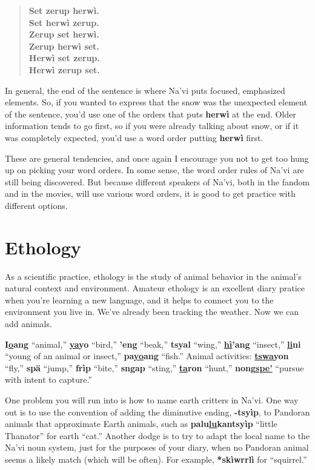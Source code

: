 \documentclass[nofonts]{tufte-handout}
\newcommand{\N}[1]{\textbf{\textcolor{navi}{#1}}}
\begin{document}
\begin{quotation}
  \noindent\N{Set zerup herwì.} \\
  \noindent\N{Set herwì zerup.} \\
  \noindent\N{Zerup set herwì.} \\
  \noindent\N{Zerup herwì set.} \\
  \noindent\N{Herwì set zerup.} \\
  \noindent\N{Herwì zerup set.}
\end{quotation}

\noindent In general, the end of the sentence is where Na'vi puts
focused, emphasized elements.  So, if you wanted to express that the
snow was the unexpected element of the sentence, you'd use one of the
orders that puts \N{herwì} at the end.  Older information
tends to go first, so if you were already talking about snow, or if it
was completely expected, you'd use a word order putting \N{herwì}
first.

These are general tendencies, and once again I encourage you not to
get too hung up on picking your word orders.  In some sense, the word
order rules of Na'vi are still being discovered.  But because
different speakers of Na'vi, both in the fandom and in the movies,
will use various word orders, it is good to get practice with
different options.


\section*{Ethology}
As a scientific practice, ethology is the study of animal behavior in
the animal's natural context and environment.  Amateur ethology is an
excellent diary pratice when you're learning a new language, and it
helps to connect you to the environment you live in.  We've already
been tracking the weather.  Now we can add animals.

\N{I\uline{o}ang} ``animal,'' \N{\uline{ya}yo} ``bird,'' \N{'eng}
``beak,'' \N{tsyal} ``wing,'' \N{\uline{hì}'ang} ``insect,''
\N{\uline{li}ni} ``young of an animal or insect,'' \N{pa\uline{yo}ang}
``fish.''  Animal activities: \N{\uline{tswa}yon} ``fly,'' \N{spä}
``jump,'' \N{frìp} ``bite,'' \N{sngap} ``sting,'' \N{\uline{ta}ron}
``hunt,'' \N{nong\uline{spe'}} ``pursue with intent to capture.''

One problem you will run into is how to name earth critters in Na'vi.
One way out is to use the convention of adding the diminutive ending,
\N{-tsyìp}, to Pandoran animals that approximate Earth animals, such
as \N{palu\uline{lu}kantsyìp} ``little Thanator'' for earth ``cat.''
Another dodge is to try to adapt the local name to the Na'vi noun
system, just for the purposes of your diary, when no Pandoran animal
seems a likely match (which will be often).  For example,
\N{*skìwrrlì} for ``squirrel.''
\end{document}
